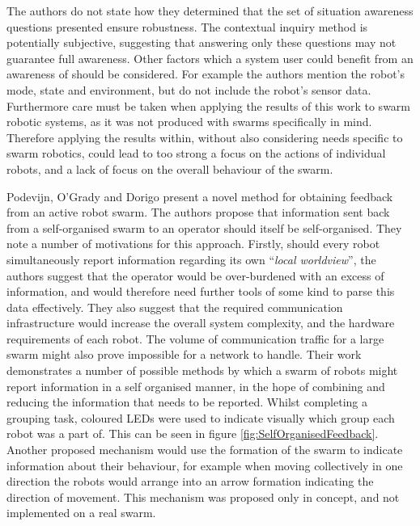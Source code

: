 The authors \cite{Rule:2012} do not state how they determined that the set of situation awareness questions presented ensure robustness. The contextual inquiry method is potentially subjective, suggesting that answering only these questions may not guarantee full awareness. Other factors which a system user could benefit from an awareness of should be considered. For example the authors mention the robot's mode, state and environment, but do not include the robot's sensor data. Furthermore care must be taken when applying the results of this work to swarm robotic systems, as it was not produced with swarms specifically in mind. Therefore applying the results within, without also considering needs specific to swarm robotics, could lead to too strong a focus on the actions of individual robots, and a lack of focus on the overall behaviour of the swarm.

Podevijn, O'Grady and Dorigo \cite{Podevijn:2012} present a novel method for obtaining feedback from an active robot swarm. The authors propose that information sent back from a self-organised swarm to an operator should itself be self-organised. They note a number of motivations for this approach. Firstly, should every robot simultaneously report information regarding its own ``\textit{local worldview}'', the authors suggest \cite{Podevijn:2012} that the operator would be over-burdened with an excess of information, and would therefore need further tools of some kind to parse this data effectively. They also suggest that the required communication infrastructure would increase the overall system complexity, and the hardware requirements of each robot. The volume of communication traffic for a large swarm might also prove impossible for a network to handle. Their work \cite{Podevijn:2012} demonstrates a number of possible methods by which a swarm of robots might report information in a self organised manner, in the hope of combining and reducing the information that needs to be reported. Whilst completing a grouping task, coloured LEDs were used to indicate visually which group each robot was a part of. This can be seen in figure \ref{fig:SelfOrganisedFeedback}. Another proposed mechanism \cite{Podevijn:2012} would use the formation of the swarm to indicate information about their behaviour, for example when moving collectively in one direction the robots would arrange into an arrow formation indicating the direction of movement. This mechanism was proposed only in concept, and not implemented on a real swarm.

